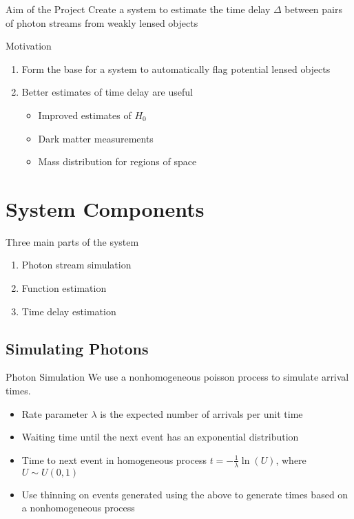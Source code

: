 \documentclass{beamer}
\begin{document}
\begin{frame}{Aim of the Project}
  Create a system to estimate the time delay $\Delta$ between pairs of
  photon streams from weakly lensed objects
\end{frame}

\begin{frame}{Motivation}
  \begin{enumerate}
  \item<1-> Form the base for a system to automatically flag potential lensed
    objects
  \item<4-> Better estimates of time delay are useful
    \begin{itemize}
    \item<5-> Improved estimates of $H_0$
    \item<6-> Dark matter measurements
    \item<7-> Mass distribution for regions of space
    \end{itemize}
  \end{enumerate}
\end{frame}

\section{System Components}

\begin{frame}
  Three main parts of the system
  \begin{enumerate}
  \item<1-> \alert<4->{Photon stream simulation}
  \item<2-> Function estimation
  \item<3-> Time delay estimation
  \end{enumerate}
\end{frame}

\subsection{Simulating Photons}

\begin{frame}{Photon Simulation}
  We use a nonhomogeneous poisson process to simulate arrival times.
  \begin{itemize}
  \item Rate parameter $\lambda$ is the expected number of arrivals per unit time
  \item Waiting time until the next event has an exponential distribution
  \item Time to next event in homogeneous process $t=-\frac{1}{\lambda}\ln(U)$,
    where $U\sim U(0,1)$
  \item Use thinning on events generated using the above to generate times based
    on a nonhomogeneous process
  \end{itemize}
\end{frame}
\end{document}
